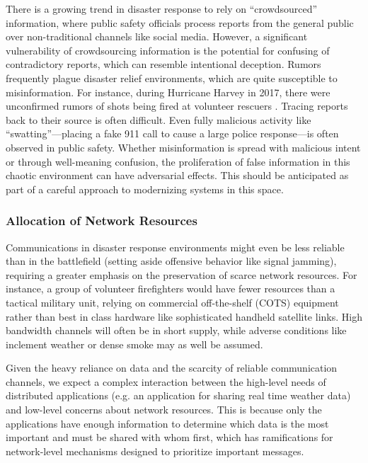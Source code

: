 \documentclass[]             %
{NASA}                       %
\theoremstyle{definition}
\begin{document}
There is a growing trend in disaster response to rely on
``crowdsourced'' information, where public safety officials process
reports from the general public over non-traditional channels like
social media. However, a significant vulnerability of crowdsourcing
information is the potential for confusing of contradictory reports,
which can resemble intentional deception. Rumors frequently plague
disaster relief environments, which are quite susceptible to
misinformation. For instance, during Hurricane Harvey in 2017, there
were unconfirmed rumors of shots being fired at volunteer rescuers
\cite{2017:cajun-navy-rumors}. Tracing reports back to their source is
often difficult. Even fully malicious activity like
``swatting''---placing a fake 911 call to cause a large police
response---is often observed in public safety. Whether misinformation
is spread with malicious intent or through well-meaning confusion, the
proliferation of false information in this chaotic environment can
have adversarial effects. This should be anticipated as part of a
careful approach to modernizing systems in this space.

\subsubsection{Allocation of Network Resources}
\label{sssec:allocation-of-network-resource}
Communications in disaster response environments might even be less
reliable than in the battlefield (setting aside offensive behavior
like signal jamming), requiring a greater emphasis on the preservation
of scarce network resources. For instance, a group of volunteer
firefighters would have fewer resources than a tactical military unit,
relying on commercial off-the-shelf (COTS) equipment rather than best
in class hardware like sophisticated handheld satellite links. High
bandwidth channels will often be in short supply, while adverse
conditions like inclement weather or dense smoke may as well be assumed.

Given the heavy reliance on data and the scarcity of reliable
communication channels, we expect a complex interaction between the
high-level needs of distributed applications (e.g. an application for
sharing real time weather data) and low-level concerns about network
resources. This is because only the applications have enough
information to determine which data is the most important and must be
shared with whom first, which has ramifications for network-level
mechanisms designed to prioritize important messages.
\end{document}
